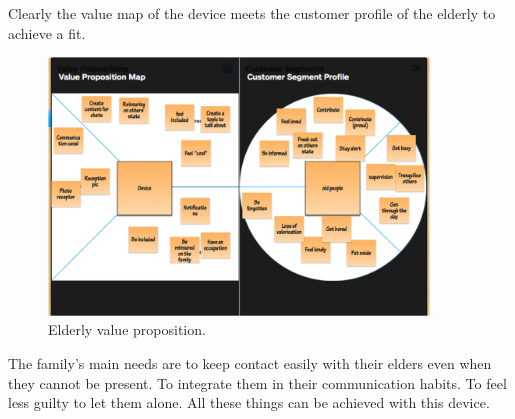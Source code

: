 Clearly the value map of the device meets the customer profile of the elderly to achieve a fit.
\clearpage
\begin{figure}[!htb]
    \centering
    \includegraphics[width=0.9\textwidth,keepaspectratio]{chap/marketFig/elderly_value_prop_canvas.png}
    \caption{Elderly value proposition.}
    \label{fig:elders value proposition}
\end{figure}

The family's main needs are to keep contact easily with their elders even when they cannot be present. To integrate them in their communication habits. To feel less guilty to let them alone. All these things can be achieved with this device.
